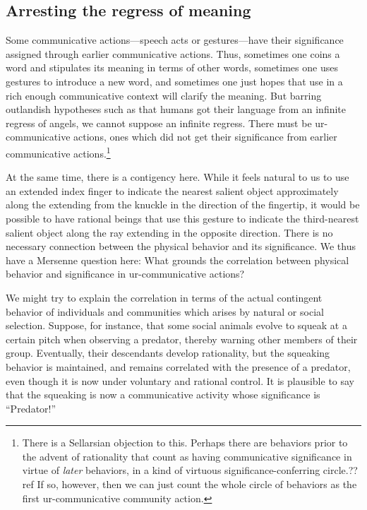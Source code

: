 \subsection{Arresting the regress of meaning}
Some communicative actions---speech acts or gestures---have their significance assigned through earlier communicative 
actions. Thus, sometimes one coins a word and stipulates its meaning in terms of other words, sometimes one uses gestures
to introduce a new word, and sometimes one just hopes that use in a rich enough communicative context will clarify the
meaning. But barring outlandish hypotheses such as that humans got their language from an
infinite regress of angels, we cannot suppose an infinite regress. There must be ur-communicative actions, ones which did not get
their significance from earlier communicative actions.\footnote{There is a Sellarsian objection to this. Perhaps there are 
behaviors prior to the advent of rationality that count as having communicative significance in virtue of \textit{later}
behaviors, in a kind of virtuous significance-conferring circle.??ref If so, however, then we can just count the whole circle 
of behaviors as the first ur-communicative community action.}

At the same time, there is a contigency here. While it feels natural to us to use an extended index
finger to indicate the nearest salient object approximately along the  extending from the knuckle in the direction of
the fingertip, it would be possible to have rational beings that use this gesture to indicate the third-nearest salient
object along the ray extending in the opposite direction. There is no necessary connection between the
physical behavior and its significance. We thus have a Mersenne question here: What grounds the correlation between
physical behavior and significance in ur-communicative actions?

We might try to explain the correlation in terms of the actual contingent behavior of individuals and communities
which arises by natural or social selection. Suppose, for instance, that some social animals evolve to squeak at 
a certain pitch when observing a predator, thereby warning other members of their group. Eventually, their descendants
develop rationality, but the squeaking behavior is maintained, and remains correlated with the presence of a predator, even 
though it is now under voluntary and rational control. It is plausible to say that the squeaking is now a communicative
activity whose significance is ``Predator!'' 

